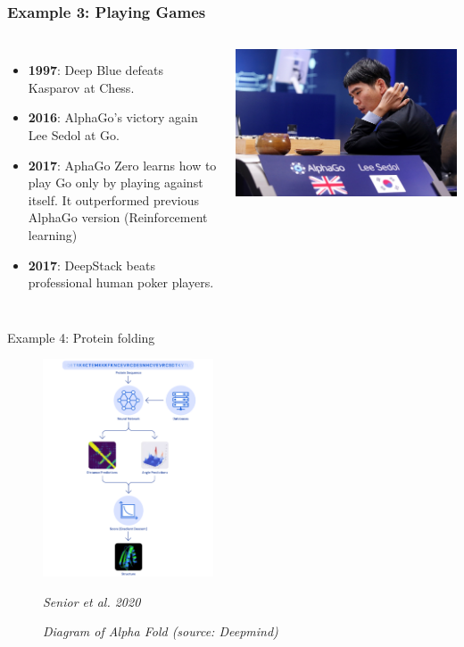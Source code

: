 \documentclass[handout]{beamer}
\newcommand{\rref}[1][]{\hfill{\scriptsize\textit{#1}}}
\begin{document}
\begin{frame}
\frametitle{Example 3: Playing Games}
\begin{columns}
\begin{itemize}
\item {\bf 1997}: Deep Blue defeats Kasparov at Chess.
\item {\bf 2016}: AlphaGo's victory again Lee Sedol at Go.
\item {\bf 2017}: AphaGo Zero learns how to play Go only by playing against
  itself. It outperformed previous AlphaGo version (Reinforcement
  learning)
\item {\bf 2017}: DeepStack beats professional human poker players.
\end{itemize}
\includegraphics[width=\textwidth]{fig/L1/alphago.jpg}
\end{columns}
\end{frame}

\begin{frame}{Example 4: Protein folding}
  \begin{figure}
        \centering
        \includegraphics[width=0.45\textwidth]{fig/L1/AlphaFold-Blog-9c_diagram2.png}
        \caption*{{\footnotesize \textit {Diagram of Alpha Fold (source: Deepmind)}}}
        \rref[Senior et al. 2020]
    \end{figure}
\end{frame}
\end{document}
